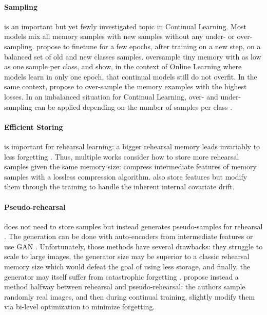 \paragraph{Sampling} is an important but yet fewly investigated topic in Continual Learning. Most
models mix all memory samples with new samples without any under- or over-sampling.
\cite{castro2018end_to_end_inc_learn} propose to finetune for a few epochs, after training on a new
step, on a balanced set of old and new classes samples. \cite{chaudhry2019tinyepisodicmemories}
oversample tiny memory with as low as one sample per class, and show, in the context of Online
Learning where models learn in only one epoch, that continual models still do not overfit. In the
same context, \cite{aljundi2019maximallyinterfered} propose to over-sample the memory examples with
the highest losses. In an imbalanced situation for Continual Learning, over- and under-sampling can be
applied depending on the number of samples per class \citep{kim2020imbalancedcontinual}.

\paragraph{Efficient Storing} is important for rehearsal learning: a bigger rehearsal memory leads
invariably to less forgetting \citep{hou2019ucir}. Thus, multiple works consider how to store more
rehearsal samples given the same memory size: \cite{hayes2020remind} compress intermediate features
of memory samples with a lossless compression algorithm.
\cite{iscen2020incrementalfeatureadaptation} also store features but modify them through the
training to handle the inherent internal covariate drift.

\paragraph{Pseudo-rehearsal} does not need to store samples but instead generates pseudo-samples for
rehearsal \citep{lesort2019generative}. The generation can be done with auto-encoders from
intermediate features \citep{kemker2018fearnet,ayub2021eec} or use \ac{GAN}
\citep{shin2017deep_generative_replay}. Unfortunately, those methods have several drawbacks: they
struggle to scale to large images, the generator size may be superior to a classic rehearsal memory
size which would defeat the goal of using less storage, and finally, the generator may itself suffer
from catastrophic forgetting \citep{zhai2019lifelonggan}. \cite{liu2020mnemonics} propose instead a
method halfway between rehearsal and pseudo-rehearsal: the authors sample randomly real images, and
then during continual training, slightly modify them via bi-level optimization
\citep{wang2018datasetdistillation} to minimize forgetting.


